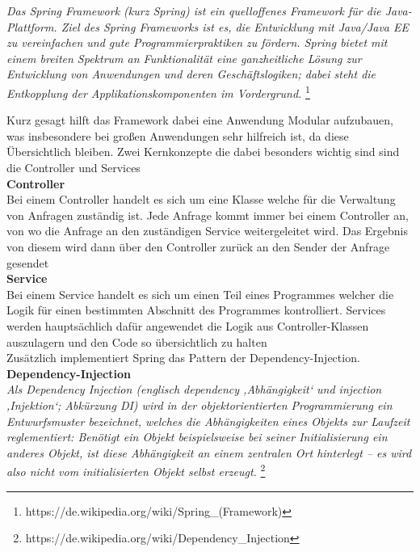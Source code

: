 \emph{\glqq   
Das Spring Framework (kurz Spring) ist ein quelloffenes Framework für die Java-Plattform. Ziel des Spring Frameworks ist es, die Entwicklung mit Java/Java EE zu vereinfachen und gute Programmierpraktiken zu fördern. Spring bietet mit einem breiten Spektrum an Funktionalität eine ganzheitliche Lösung zur Entwicklung von Anwendungen und deren Geschäftslogiken; dabei steht die Entkopplung der Applikationskomponenten im Vordergrund.
\grqq} \footnote{https://de.wikipedia.org/wiki/Spring\_(Framework)}

Kurz gesagt hilft das Framework dabei eine Anwendung Modular aufzubauen, was insbesondere bei großen Anwendungen sehr hilfreich ist, da diese Übersichtlich bleiben. Zwei Kernkonzepte die dabei besonders wichtig sind sind die Controller und Services \\

\textbf{Controller}\\
Bei einem Controller handelt es sich um eine Klasse welche für die Verwaltung von Anfragen zuständig ist. Jede Anfrage kommt immer bei einem Controller an, von wo die Anfrage an den zuständigen Service weitergeleitet wird. Das Ergebnis von diesem wird dann über den Controller zurück an den Sender der Anfrage gesendet \\

\textbf{Service}\\
Bei einem Service handelt es sich um einen Teil eines Programmes welcher die Logik für einen bestimmten Abschnitt des Programmes kontrolliert. Services werden hauptsächlich dafür angewendet die Logik aus Controller-Klassen auszulagern und den Code so übersichtlich zu halten \\

Zusätzlich implementiert Spring das Pattern der Dependency-Injection. \\

\textbf{Dependency-Injection}\\
\emph{\glqq   
Als Dependency Injection (englisch dependency ‚Abhängigkeit‘ und injection ‚Injektion‘; Abkürzung DI) wird in der objektorientierten Programmierung ein Entwurfsmuster bezeichnet, welches die Abhängigkeiten eines Objekts zur Laufzeit reglementiert: Benötigt ein Objekt beispielsweise bei seiner Initialisierung ein anderes Objekt, ist diese Abhängigkeit an einem zentralen Ort hinterlegt – es wird also nicht vom initialisierten Objekt selbst erzeugt. \grqq} \footnote{https://de.wikipedia.org/wiki/Dependency\_Injection} \\ 

